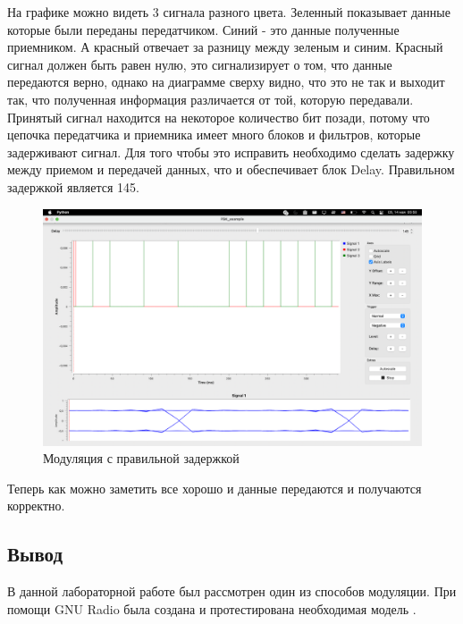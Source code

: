 На графике можно видеть 3 сигнала разного цвета. Зеленный показывает данные которые были переданы передатчиком. Синий - это данные полученные приемником. А красный отвечает за разницу между зеленым и синим. Красный сигнал должен быть равен нулю, это сигнализирует о том, что данные передаются верно, однако на диаграмме сверху видно, что это не так и выходит так, что полученная информация различается от той, которую передавали. Принятый сигнал находится на некоторое количество бит позади, потому что цепочка передатчика и приемника имеет много блоков и фильтров, которые задерживают сигнал. Для того чтобы это исправить необходимо сделать задержку между приемом и передачей данных, что и обеспечивает блок Delay. Правильном задержкой является 145. 

    \begin{figure}[H]
	\begin{center}
		\includegraphics[scale=0.3]{fig/lab12/lab12_3.png}
		\caption{Модуляция с правильной задержкой}
		\label{pic:e2} %
	\end{center}
\end{figure}

Теперь как можно заметить все хорошо и данные передаются и получаются корректно. 

\subsection{Вывод}
В данной лабораторной работе был рассмотрен один из способов модуляции. При помощи GNU Radio была создана и протестирована необходимая модель . 
